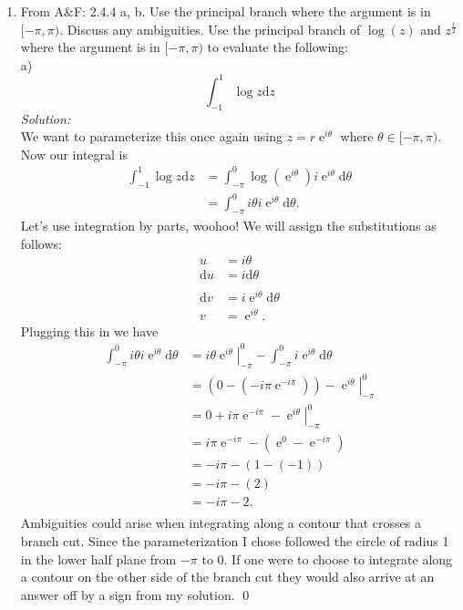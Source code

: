 \documentclass[10pt]{amsart}
\newcommand{\D}{\mathrm{d}}
\DeclareMathOperator{\E}{e}
\theoremstyle{nonumberplain}
\begin{document}
\begin{enumerate}[label={\bf {\arabic*}:}]
\item From A\&F: 2.4.4 a, b.
Use the principal branch where the argument is in $[-\pi,\pi)$.
Discuss any ambiguities. 
Use the principal branch of $\log(z)$ and $z^{\frac{1}{2}}$ where the argument is in $[-\pi,\pi)$ to evaluate the following: \\
a) $$\int_{-1}^{1}\log z \D z$$
\textit{Solution:} \\
We want to parameterize this once again using $z = r\E^{i\theta}$ where $\theta \in [-\pi,\pi)$. Now our integral is
\begin{align*}
\int_{-1}^{1}\log z \D z &= \int_{-\pi}^{0}\log \left(\E^{i\theta}\right) i \E^{i\theta} \D \theta \\
	&= \int_{-\pi}^{0} i\theta i \E^{i\theta} \D \theta.
\end{align*}
Let's use integration by parts, woohoo! We will assign the substitutions as follows:
\begin{align*}
u &= i\theta \\
\D u &= i \D \theta\\
\\
\D v &= i\E^{i \theta} \D \theta \\
v &= \E^{i \theta}.
\end{align*}
Plugging this in we have
\begin{align*}
\int_{-\pi}^{0} i\theta i \E^{i\theta} \D \theta &= \left. i\theta \E^{i\theta}\right|_{-\pi}^0 - \int_{-\pi}^0 i \E^{i \theta} \D \theta \\
	&= \left(0 - \left(-i\pi \E^{-i\pi}\right)\right) - \left. \E^{i\theta}\right|_{-\pi}^0 \\
	&= 0 + i\pi \E^{-i\pi} - \left. \E^{i\theta}\right|_{-\pi}^0 \\
	&= i\pi \E^{-i\pi} - \left(\E^{0} - \E^{-i\pi} \right) \\
	&= - i\pi - \left(1 - \left( - 1 \right) \right) \\
	&= - i\pi - \left(2\right) \\
	&= - i\pi - 2. \\
\end{align*}
Ambiguities could arise when integrating along a contour that crosses a branch cut.
Since the parameterization I chose followed the circle of radius 1 in the lower half plane from $-\pi$ to $0$.
If one were to choose to integrate along a contour on the other side of the branch cut they would also arrive at an answer off by a sign from my solution.
\qed
\\


\end{enumerate}
\end{document}
